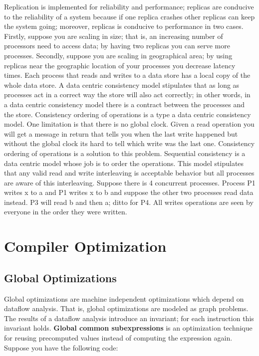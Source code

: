\documentclass{amsbook}
\begin{document}
Replication is implemented for reliability and performance; replicas are conducive to the reliability of a system because if one replica crashes other replicas can keep the system going; moreover, replicas is conducive to performance in two cases. Firstly, suppose you are scaling in size; that is, an increasing number of processors need to access data; by having two replicas you can serve more processes. Secondly, suppose you are scaling in geographical area; by using replicas near the geographic location of your processes you decrease latency times. Each process that reads and writes to a data store has a local copy of the whole data store. A data centric consistency model stipulates that as long as processes act in a correct way the store will also act correctly; in other words, in a data centric consistency model there is a contract between the processes and the store. Consistency ordering of operations is a type a data centric consistency model. One limitation is that there is no global clock. Given a read operation you will get a message in return that tells you when the last write happened but without the global clock its hard to tell which write was the last one. Consistency ordering of operations is a solution to this problem. Sequential consistency is a data centric model whose job is to order the operations. This model stipulates that any valid read and write interleaving is acceptable behavior but all processes are aware of this interleaving. Suppose there is 4 concurrent processes. Process P1 writes x to a and P1 writes x to b and suppose the other two processes read data instead. P3 will read b and then a; ditto for P4.  All writes operations are seen by everyone in the order they were written.

\chapter{Compiler Optimization}
\section{Global Optimizations}
Global optimizations are machine independent optimizations which depend on dataflow analysis. That is, global optimizations are modeled as graph problems. The results of a dataflow analysis introduce an invariant; for each instruction this invariant holds. \textbf{Global common subexpressions} is an optimization technique for reusing precomputed values instead of computing the expression again. Suppose you have the following code:
\end{document}

